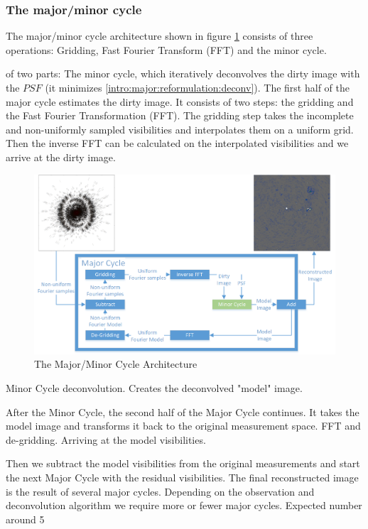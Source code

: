 \subsubsection{The major/minor cycle}
The major/minor cycle architecture shown in figure \ref{intro:major:fig} consists of three operations: Gridding, Fast Fourier Transform (FFT) and the minor cycle.

 of two parts: The minor cycle, which iteratively deconvolves the dirty image with the $PSF$ (it minimizes \eqref{intro:major:reformulation:deconv}). The first half of the major cycle estimates the dirty image. It consists of two steps: the gridding and the Fast Fourier Transformation (FFT). The gridding step takes the incomplete and non-uniformly sampled visibilities and interpolates them on a uniform grid. Then the inverse FFT can be calculated on the interpolated visibilities and we arrive at the dirty image.

\begin{figure}[h]
	\centering
	\includegraphics[width=0.90\linewidth]{./chapters/02.hypo/Major-Minor3.png}
	\caption{The Major/Minor Cycle Architecture}
	\label{intro:major:fig}
\end{figure}

Minor Cycle deconvolution. Creates the deconvolved "model" image.

After the Minor Cycle, the second half of the Major Cycle continues. It takes the model image and transforms it back to the original measurement space. FFT and de-gridding. Arriving at the model visibilities.

Then we subtract the model visibilities from the original measurements and start the next Major Cycle with the residual visibilities. The final reconstructed image is the result of several major cycles. Depending on the observation and deconvolution algorithm we require more or fewer major cycles. Expected number around 5


